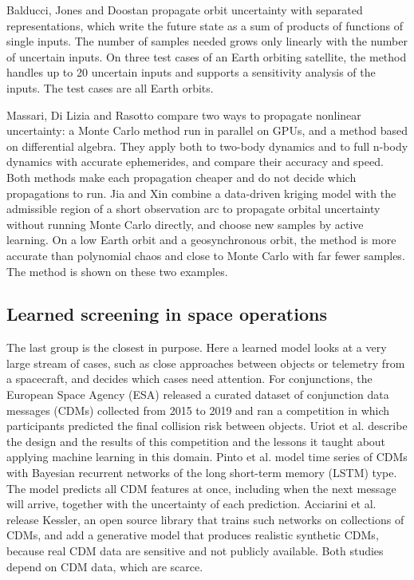 Balducci, Jones and Doostan \cite{balducci2017} propagate orbit uncertainty with separated representations, which write the future state as a sum of products of functions of single inputs. The number of samples needed grows only linearly with the number of uncertain inputs. On three test cases of an Earth orbiting satellite, the method handles up to 20 uncertain inputs and supports a sensitivity analysis of the inputs. The test cases are all Earth orbits.

Massari, Di Lizia and Rasotto \cite{massari2017} compare two ways to propagate nonlinear uncertainty: a Monte Carlo method run in parallel on GPUs, and a method based on differential algebra. They apply both to two-body dynamics and to full n-body dynamics with accurate ephemerides, and compare their accuracy and speed. Both methods make each propagation cheaper and do not decide which propagations to run. Jia and Xin \cite{jia2022} combine a data-driven kriging model with the admissible region of a short observation arc to propagate orbital uncertainty without running Monte Carlo directly, and choose new samples by active learning. On a low Earth orbit and a geosynchronous orbit, the method is more accurate than polynomial chaos and close to Monte Carlo with far fewer samples. The method is shown on these two examples.

\subsection{Learned screening in space operations}
\label{sec:rw-ops}

The last group is the closest in purpose. Here a learned model looks at a very large stream of cases, such as close approaches between objects or telemetry from a spacecraft, and decides which cases need attention. For conjunctions, the European Space Agency (ESA) released a curated dataset of conjunction data messages (CDMs) collected from 2015 to 2019 and ran a competition in which participants predicted the final collision risk between objects. Uriot et al. \cite{uriot2020} describe the design and the results of this competition and the lessons it taught about applying machine learning in this domain. Pinto et al. \cite{pinto2020} model time series of CDMs with Bayesian recurrent networks of the long short-term memory (LSTM) type. The model predicts all CDM features at once, including when the next message will arrive, together with the uncertainty of each prediction. Acciarini et al. \cite{acciarini2021} release Kessler, an open source library that trains such networks on collections of CDMs, and add a generative model that produces realistic synthetic CDMs, because real CDM data are sensitive and not publicly available. Both studies depend on CDM data, which are scarce.

